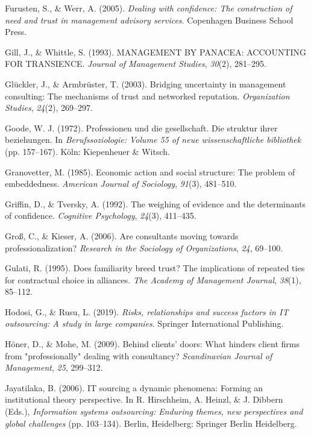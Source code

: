 \documentclass[
  man,floatsintext]{apa6}
\newlength{\cslhangindent}
\newenvironment{CSLReferences}[2] %
 {\begin{list}{}{%
  \setlength{\itemindent}{0pt}
  \setlength{\leftmargin}{0pt}
  \setlength{\parsep}{0pt}
  \ifodd #1
   \setlength{\leftmargin}{\cslhangindent}
   \setlength{\itemindent}{-1\cslhangindent}
  \fi
  \setlength{\itemsep}{#2\baselineskip}}}
 {\end{list}}
\begin{document}
\begin{CSLReferences}{1}{0}
Furusten, S., \& Werr, A. (2005). \emph{Dealing with confidence: The construction of need and trust in management advisory services}. Copenhagen Business School Press.

Gill, J., \& Whittle, S. (1993). MANAGEMENT BY PANACEA: ACCOUNTING FOR TRANSIENCE. \emph{Journal of Management Studies}, \emph{30}(2), 281--295.

Glückler, J., \& Armbrüster, T. (2003). Bridging uncertainty in management consulting: The mechanisms of trust and networked reputation. \emph{Organization Studies}, \emph{24}(2), 269--297.

Goode, W. J. (1972). Professionen und die gesellschaft. Die struktur ihrer beziehungen. In \emph{Berufssoziologie: Volume 55 of neue wissenschaftliche bibliothek} (pp. 157--167). Köln: Kiepenheuer \& Witsch.

Granovetter, M. (1985). Economic action and social structure: The problem of embeddedness. \emph{American Journal of Sociology}, \emph{91}(3), 481--510.

Griffin, D., \& Tversky, A. (1992). The weighing of evidence and the determinants of confidence. \emph{Cognitive Psychology}, \emph{24}(3), 411--435.

Groß, C., \& Kieser, A. (2006). Are consultants moving towards professionalization? \emph{Research in the Sociology of Organizations}, \emph{24}, 69--100.

Gulati, R. (1995). Does familiarity breed trust? The implications of repeated ties for contractual choice in alliances. \emph{The Academy of Management Journal}, \emph{38}(1), 85--112.

Hodosi, G., \& Rusu, L. (2019). \emph{Risks, relationships and success factors in IT outsourcing: A study in large companies}. Springer International Publishing.

Höner, D., \& Mohe, M. (2009). Behind clients' doors: What hinders client firms from "professionally" dealing with consultancy? \emph{Scandinavian Journal of Management}, \emph{25}, 299--312.

Jayatilaka, B. (2006). IT sourcing a dynamic phenomena: Forming an institutional theory perspective. In R. Hirschheim, A. Heinzl, \& J. Dibbern (Eds.), \emph{Information systems outsourcing: Enduring themes, new perspectives and global challenges} (pp. 103--134). Berlin, Heidelberg: Springer Berlin Heidelberg.


\end{CSLReferences}
\end{document}
